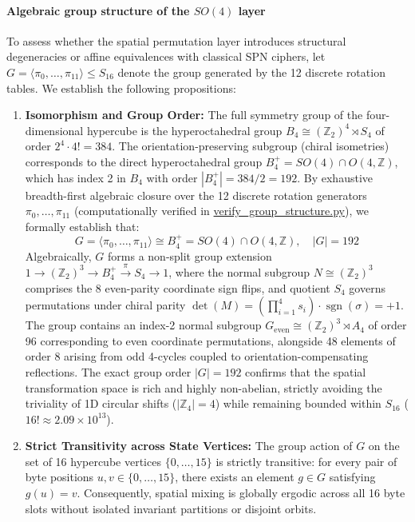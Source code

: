 \documentclass[10pt,twocolumn]{article}
\begin{document}
\paragraph{Algebraic group structure of the $SO(4)$ layer}
To assess whether the spatial permutation layer introduces structural degeneracies or affine equivalences with classical SPN ciphers, let $G = \langle \pi_0, \dots, \pi_{11} \rangle \le S_{16}$ denote the group generated by the 12 discrete rotation tables. We establish the following propositions:
\begin{enumerate}
    \item \textbf{Isomorphism and Group Order:} The full symmetry group of the four-dimensional hypercube is the hyperoctahedral group $B_4 \cong (\mathbb{Z}_2)^4 \rtimes S_4$ of order $2^4 \cdot 4! = 384$. The orientation-preserving subgroup (chiral isometries) corresponds to the direct hyperoctahedral group $B_4^+ = SO(4) \cap O(4, \mathbb{Z})$, which has index 2 in $B_4$ with order $|B_4^+| = 384 / 2 = 192$. By exhaustive breadth-first algebraic closure over the 12 discrete rotation generators $\pi_0, \dots, \pi_{11}$ (computationally verified in \url{verify_group_structure.py}), we formally establish that:
    \begin{equation}
        G = \langle \pi_0, \dots, \pi_{11} \rangle \cong B_4^+ = SO(4) \cap O(4, \mathbb{Z}), \quad |G| = 192
    \end{equation}
    Algebraically, $G$ forms a non-split group extension $1 \to (\mathbb{Z}_2)^3 \to B_4^+ \xrightarrow{\pi} S_4 \to 1$, where the normal subgroup $N \cong (\mathbb{Z}_2)^3$ comprises the 8 even-parity coordinate sign flips, and quotient $S_4$ governs permutations under chiral parity $\det(M) = (\prod_{i=1}^4 s_i) \cdot \operatorname{sgn}(\sigma) = +1$. The group contains an index-2 normal subgroup $G_{\text{even}} \cong (\mathbb{Z}_2)^3 \rtimes A_4$ of order 96 corresponding to even coordinate permutations, alongside 48 elements of order 8 arising from odd 4-cycles coupled to orientation-compensating reflections. The exact group order $|G| = 192$ confirms that the spatial transformation space is rich and highly non-abelian, strictly avoiding the triviality of 1D circular shifts ($|\mathbb{Z}_4| = 4$) while remaining bounded within $S_{16}$ ($16! \approx 2.09 \times 10^{13}$).
    \item \textbf{Strict Transitivity across State Vertices:} The group action of $G$ on the set of 16 hypercube vertices $\{0, \dots, 15\}$ is strictly transitive: for every pair of byte positions $u, v \in \{0, \dots, 15\}$, there exists an element $g \in G$ satisfying $g(u) = v$. Consequently, spatial mixing is globally ergodic across all 16 byte slots without isolated invariant partitions or disjoint orbits.

\end{enumerate}
\end{document}
